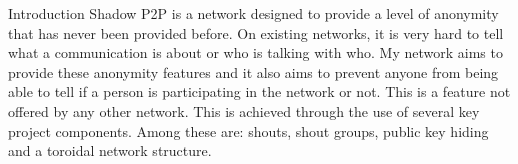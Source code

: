 \documentclass[ %
                    author={Luke Murray},
                supervisor={Dr. Simon Hollis},
                     title={Shadow Peer-to-Peer Networks},
                  subtitle={},
                    degree={MEng},
                      year={2013} ]{poster}
\begin{document}

\begin{frame}{} 

\vfill

\begin{columns}[t]
    \begin{column}{0.900\linewidth}
    \begin{block}{\normalsize Introduction}
    \small Shadow P2P is a network designed to provide a level of anonymity that has never been provided before. On existing networks, it is very hard to tell what a communication is about or who is talking with who. My network aims to provide these anonymity features and it also aims to prevent anyone from being able to tell if a person is participating in the network or not. This is a feature not offered by any other network. This is achieved through the use of several key project components. Among these are: shouts, shout groups, public key hiding and a toroidal network structure.
    \end{block}
    \end{column}
\end{columns}

\vfill


\end{frame}
\end{document}
